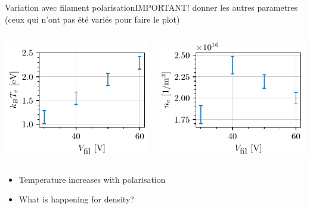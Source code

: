 \documentclass[10pt]{beamer}
\begin{document}
\begin{frame}{Variation avec filament polarisation}{IMPORTANT! donner les autres parametres (ceux qui n'ont pas été variés pour faire le plot)}
    \begin{columns}
        \centering
        \includegraphics[scale=1]{../figures/temperatureeV_filament_polarisation.pdf}


        \centering
        \includegraphics[scale=1]{../figures/density_filament_polarisation.pdf}

    \end{columns}
    \vspace{0.5cm}
    \begin{itemize}
        \item Temperature increases with polarisation
        \item What is happening for density?
    \end{itemize}
\end{frame}
\end{document}
